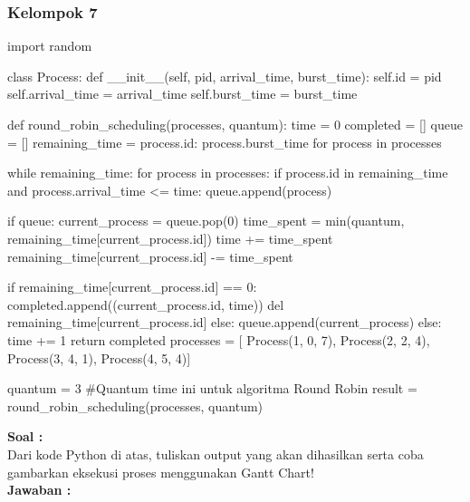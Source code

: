 \documentclass[12pt]{article}
\begin{document}
\subsubsection{Kelompok 7}
\begin{python}
    import random

class Process:
    def __init__(self, pid, arrival_time, burst_time):
        self.id = pid
        self.arrival_time = arrival_time
        self.burst_time = burst_time

def round_robin_scheduling(processes, quantum):
    time = 0
    completed = []
    queue = []
    remaining_time = {process.id: process.burst_time for process in processes}

    while remaining_time:
        for process in processes:
            if process.id in remaining_time and process.arrival_time <= time:
                queue.append(process)

        if queue:
            current_process = queue.pop(0)
            time_spent = min(quantum, remaining_time[current_process.id])
            time += time_spent
            remaining_time[current_process.id] -= time_spent
            
            if remaining_time[current_process.id] == 0:
                completed.append((current_process.id, time))
                del remaining_time[current_process.id]
            else:
                queue.append(current_process)
        else:
            time += 1
    return completed
    processes = [
        Process(1, 0, 7),
        Process(2, 2, 4),
        Process(3, 4, 1),
        Process(4, 5, 4)]

quantum = 3 #Quantum time ini untuk algoritma Round Robin
result = round_robin_scheduling(processes, quantum)
\end{python}
\textbf{Soal : } \\
Dari kode Python di atas, tuliskan output yang akan dihasilkan serta coba gambarkan eksekusi proses menggunakan Gantt Chart! \\
\textbf{Jawaban :} \\
\end{document}
